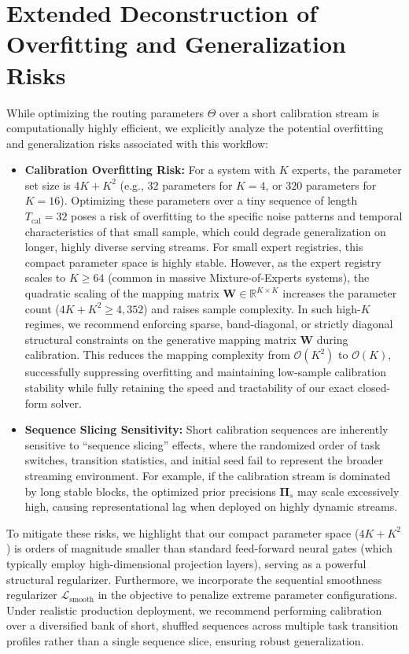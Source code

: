 \documentclass{article}
\theoremstyle{plain}
\theoremstyle{definition}
\theoremstyle{remark}
\begin{document}
\section{Extended Deconstruction of Overfitting and Generalization Risks}
\label{app:overfitting_risks}

While optimizing the routing parameters $\Theta$ over a short calibration stream is computationally highly efficient, we explicitly analyze the potential overfitting and generalization risks associated with this workflow:
\begin{itemize}
    \item \textbf{Calibration Overfitting Risk:} For a system with $K$ experts, the parameter set size is $4K + K^2$ (e.g., $32$ parameters for $K=4$, or $320$ parameters for $K=16$). Optimizing these parameters over a tiny sequence of length $T_{\text{cal}} = 32$ poses a risk of overfitting to the specific noise patterns and temporal characteristics of that small sample, which could degrade generalization on longer, highly diverse serving streams. For small expert registries, this compact parameter space is highly stable. However, as the expert registry scales to $K \ge 64$ (common in massive Mixture-of-Experts systems), the quadratic scaling of the mapping matrix $\mathbf{W} \in \mathbb{R}^{K \times K}$ increases the parameter count ($4K + K^2 \ge 4,352$) and raises sample complexity. In such high-$K$ regimes, we recommend enforcing sparse, band-diagonal, or strictly diagonal structural constraints on the generative mapping matrix $\mathbf{W}$ during calibration. This reduces the mapping complexity from $\mathcal{O}(K^2)$ to $\mathcal{O}(K)$, successfully suppressing overfitting and maintaining low-sample calibration stability while fully retaining the speed and tractability of our exact closed-form solver.
    \item \textbf{Sequence Slicing Sensitivity:} Short calibration sequences are inherently sensitive to ``sequence slicing'' effects, where the randomized order of task switches, transition statistics, and initial seed fail to represent the broader streaming environment. For example, if the calibration stream is dominated by long stable blocks, the optimized prior precisions $\mathbf{\Pi}_s$ may scale excessively high, causing representational lag when deployed on highly dynamic streams.
\end{itemize}
To mitigate these risks, we highlight that our compact parameter space ($4K + K^2$) is orders of magnitude smaller than standard feed-forward neural gates (which typically employ high-dimensional projection layers), serving as a powerful structural regularizer. Furthermore, we incorporate the sequential smoothness regularizer $\mathcal{L}_{\text{smooth}}$ in the objective to penalize extreme parameter configurations. Under realistic production deployment, we recommend performing calibration over a diversified bank of short, shuffled sequences across multiple task transition profiles rather than a single sequence slice, ensuring robust generalization.
\end{document}
